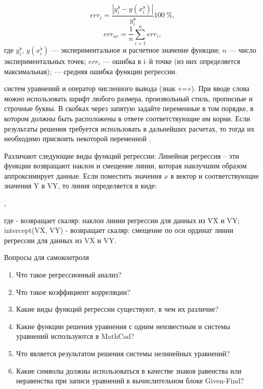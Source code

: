 \begin{equation}
	err_i= \dfrac{\left| y_i^э - y(x^э_i) \right|}{y_i^э} 100\ \% ,
\end{equation}
\begin{equation}
	err_{av}=\dfrac{1}{n}\sum\limits_{i=1}^{n} err_i ,
\end{equation}
где $y_i^э$, $y(x_i^э)$ --- экспериментальное и расчетное значение функции; $n$ --- число экспериментальных точек; $err_i$ --- ошибка в i–й точке (из них определяется максимальная);  --- средняя ошибка функции регрессии.

систем уравнений и оператор численного вывода (знак «=»). При вводе слова  можно использовать шрифт любого размера, произвольный стиль, прописные и строчные буквы. В скобках через запятую задайте переменные в том порядке, в котором должны быть расположены в ответе соответствующие им корни. Если результаты решения требуется использовать в дальнейших расчетах, то тогда их необходимо присвоить некоторой переменной .

Различают следующие виды функций регрессии:
Линейная регрессия – эти функции возвращают наклон и смещение линии, которая наилучшим образом аппроксимирует данные.
Если поместить значения $x$ в вектор  и соответствующие значения Y в VY, то линия определяется в виде:

,

где  - возвращает скаляр: наклон линии регрессии для данных из VX и VY;
intercept(VX, VY) - возвращает скаляр: смещение по оси ординат линии регрессии для данных из VX и VY.


Вопросы для самоконтроля
\begin{enumerate}
\item Что такое регрессионный анализ?
\item Что такое коэффициент корреляции?
\item Какие виды функций регрессии существуют, в чем их различие?
\item Какие функции решения уравнения с одним неизвестным и системы уравнений используются в MathCad?
\item Что является результатом решения системы нелинейных уравнений?
\item Какие символы должны использоваться в качестве знаков равенства или неравенства при записи уравнений в вычислительном блоке Given-Find?
\end{enumerate}